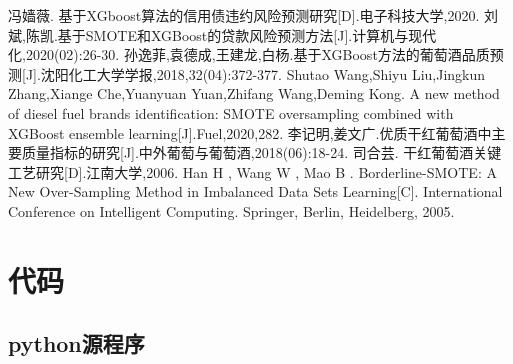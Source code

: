 \documentclass{whutmod}
\newcommand{\upcite}[1]{\textsuperscript{\textsuperscript{\cite{#1}}}}
\begin{document}
\appendix %
\begin{thebibliography}{9}%
	冯嫱薇. 基于XGboost算法的信用债违约风险预测研究[D].电子科技大学,2020.
	刘斌,陈凯.基于SMOTE和XGBoost的贷款风险预测方法[J].计算机与现代化,2020(02):26-30.
	孙逸菲,袁德成,王建龙,白杨.基于XGBoost方法的葡萄酒品质预测[J].沈阳化工大学学报,2018,32(04):372-377.
     Shutao Wang,Shiyu Liu,Jingkun Zhang,Xiange Che,Yuanyuan Yuan,Zhifang Wang,Deming Kong. A new method of diesel fuel brands identification: SMOTE oversampling combined with XGBoost ensemble learning[J].Fuel,2020,282.
     李记明,姜文广.优质干红葡萄酒中主要质量指标的研究[J].中外葡萄与葡萄酒,2018(06):18-24.
     司合芸. 干红葡萄酒关键工艺研究[D].江南大学,2006.
     Han H , Wang W , Mao B . Borderline-SMOTE: A New Over-Sampling Method in Imbalanced Data Sets Learning[C]. International Conference on Intelligent Computing. Springer, Berlin, Heidelberg, 2005.
\end{thebibliography}
\newpage
\section{代码}
\subsection{python源程序}





\end{document}
